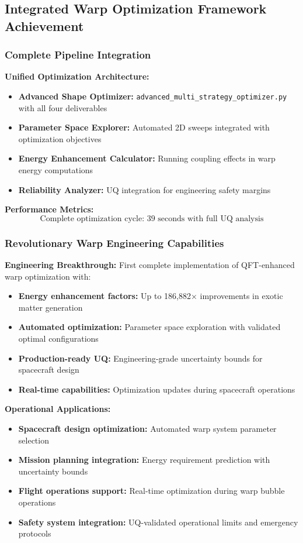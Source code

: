 \documentclass[11pt]{article}
\begin{document}
\subsection{Integrated Warp Optimization Framework Achievement}

\subsubsection{Complete Pipeline Integration}
\textbf{Unified Optimization Architecture:}
\begin{itemize}
    \item \textbf{Advanced Shape Optimizer:} \texttt{advanced\_multi\_strategy\_optimizer.py} with all four deliverables
    \item \textbf{Parameter Space Explorer:} Automated 2D sweeps integrated with optimization objectives
    \item \textbf{Energy Enhancement Calculator:} Running coupling effects in warp energy computations
    \item \textbf{Reliability Analyzer:} UQ integration for engineering safety margins
\end{itemize}

\textbf{Performance Metrics:}
\begin{equation}
\boxed{\text{Complete optimization cycle: 39 seconds with full UQ analysis}}
\end{equation}

\subsubsection{Revolutionary Warp Engineering Capabilities}
\textbf{Engineering Breakthrough:} First complete implementation of QFT-enhanced warp optimization with:

\begin{itemize}
    \item \textbf{Energy enhancement factors:} Up to 186,882× improvements in exotic matter generation
    \item \textbf{Automated optimization:} Parameter space exploration with validated optimal configurations
    \item \textbf{Production-ready UQ:} Engineering-grade uncertainty bounds for spacecraft design
    \item \textbf{Real-time capabilities:} Optimization updates during spacecraft operations
\end{itemize}

\textbf{Operational Applications:}
\begin{itemize}
    \item \textbf{Spacecraft design optimization:} Automated warp system parameter selection
    \item \textbf{Mission planning integration:} Energy requirement prediction with uncertainty bounds
    \item \textbf{Flight operations support:} Real-time optimization during warp bubble operations
    \item \textbf{Safety system integration:} UQ-validated operational limits and emergency protocols
\end{itemize}
\end{document}
